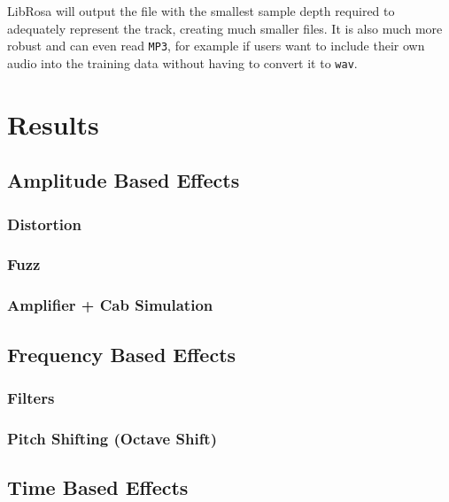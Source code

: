\documentclass{l4proj}
\begin{document}
LibRosa will output the file with the smallest sample depth required to
adequately represent the track, creating much smaller files. It is also
much more robust and can even read \texttt{MP3}, for example if users
want to include their own audio into the training data without having to
convert it to \texttt{wav}.

\chapter{Results}\label{results}

\section{Amplitude Based Effects}\label{amplitude-based-effects}

\subsection{Distortion}\label{distortion}

\subsection{Fuzz}\label{fuzz}

\subsection{Amplifier + Cab Simulation}\label{amplifier-cab-simulation}

\section{Frequency Based Effects}\label{frequency-based-effects}

\subsection{Filters}\label{filters}

\subsection{Pitch Shifting (Octave
Shift)}\label{pitch-shifting-octave-shift}

\section{Time Based Effects}\label{time-based-effects}
\end{document}
